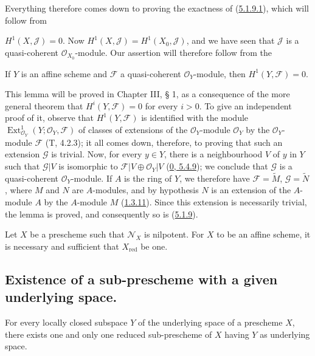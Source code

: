 Everything therefore comes down to proving the exactness of
(\hyperref[I.5.1.9.1]{5.1.9.1}), which will follow from

$H^1(X,\mathscr{J})=0$. Now
$H^1(X,\mathscr{J})=H^1(X_0,\mathscr{J})$, and we have seen that
$\mathscr{J}$ is a quasi-coherent $\mathscr{O}_{X_0}$-module. Our
assertion will therefore follow from the

\begin{lemma}[5.1.9.2]
\label{I.5.1.9.2}
If $Y$ is an affine scheme and $\mathscr{F}$ a quasi-coherent
$\mathscr{O}_Y$-module, then $H^1(Y,\mathscr{F})=0$.
\end{lemma}

This lemma will be proved in Chapter III, § 1, as a consequence of the more
general theorem that $H^i(Y,\mathscr{F})=0$ for every $i>0$. To give an
independent proof of it, observe that $H^1(Y,\mathscr{F})$ is identified with
the module $\operatorname{Ext}^1_{\mathscr{O}_Y}
(Y;\mathscr{O}_Y,\mathscr{F})$ of classes of extensions of the
$\mathscr{O}_Y$-module $\mathscr{O}_Y$ by the $\mathscr{O}_Y$-module
$\mathscr{F}$ (T, 4.2.3); it all comes down, therefore, to proving that such
an extension $\mathscr{G}$ is trivial. Now, for every $y\in Y$, there is a
neighbourhood $V$ of $y$ in $Y$ such that $\mathscr{G}|V$ is isomorphic to
$\mathscr{F}|V\oplus\mathscr{O}_Y|V$
(\hyperref[0.5.4.9]{0, 5.4.9}); we conclude that $\mathscr{G}$ is a
quasi-coherent $\mathscr{O}_Y$-module. If $A$ is the ring of $Y$, we
therefore have $\mathscr{F}=\widetilde{M}$, $\mathscr{G}=\widetilde{N}$,
where $M$ and $N$ are $A$-modules, and by hypothesis $N$ is an extension of
the $A$-module $A$ by the $A$-module $M$ (\hyperref[I.1.3.11]{1.3.11}).
Since this extension is necessarily trivial, the lemma is proved, and
consequently so is (\hyperref[I.5.1.9]{5.1.9}).

\begin{corollary}[5.1.10]
\label{I.5.1.10}
Let $X$ be a prescheme such that $\mathscr{N}_X$ is nilpotent. For $X$
to be an affine scheme, it is necessary and sufficient that $X_{\mathrm{red}}$
be one.
\end{corollary}

\subsection{Existence of a sub-prescheme with a given underlying space.}
\label{subsection:I.5.2}

\begin{proposition}[5.2.1]
\label{I.5.2.1}
For every locally closed subspace $Y$ of the underlying space of a
prescheme $X$, there exists one and only one reduced sub-prescheme of $X$
having $Y$ as underlying space.
\end{proposition}

